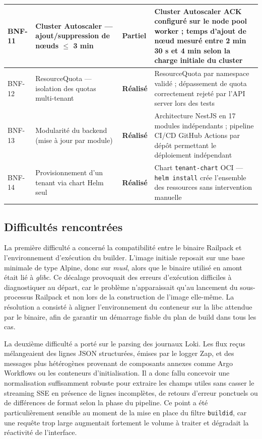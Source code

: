 \begin{longtable}{|p{0.8cm}|p{5.5cm}|p{2.2cm}|p{4.5cm}|}
BNF-11
  & Cluster Autoscaler — ajout/suppression de nœuds $\leq$ 3 min
  & \textcolor{orange!80!black}{\textbf{Partiel}}
  & Cluster Autoscaler ACK configuré sur le node pool worker ; temps d'ajout de nœud mesuré entre 2 min 30 s et 4 min selon la charge initiale du cluster \\
\hline

BNF-12
  & ResourceQuota — isolation des quotas multi-tenant
  & \textcolor{green!60!black}{\textbf{Réalisé}}
  & ResourceQuota par namespace validé ; dépassement de quota correctement rejeté par l'API server lors des tests \\
\hline

BNF-13
  & Modularité du backend (mise à jour par module)
  & \textcolor{green!60!black}{\textbf{Réalisé}}
  & Architecture NestJS en 17 modules indépendants ; pipeline CI/CD GitHub Actions par dépôt permettant le déploiement indépendant \\
\hline

BNF-14
  & Provisionnement d'un tenant via chart Helm seul
  & \textcolor{green!60!black}{\textbf{Réalisé}}
  & Chart \texttt{tenant-chart} OCI — \texttt{helm install} crée l'ensemble des ressources sans intervention manuelle \\
\hline

\end{longtable}

\subsection{Difficultés rencontrées}

La première difficulté a concerné la compatibilité entre le binaire Railpack et l'environnement d'exécution du builder. L'image initiale reposait sur une base minimale de type Alpine, donc sur \textit{musl}, alors que le binaire utilisé en amont était lié à \textit{glibc}. Ce décalage provoquait des erreurs d'exécution difficiles à diagnostiquer au départ, car le problème n'apparaissait qu'au lancement du sous-processus Railpack et non lors de la construction de l'image elle-même. La résolution a consisté à aligner l'environnement du conteneur sur la libc attendue par le binaire, afin de garantir un démarrage fiable du plan de build dans tous les cas.

La deuxième difficulté a porté sur le parsing des journaux Loki. Les flux reçus mélangeaient des lignes JSON structurées, émises par le logger Zap, et des messages plus hétérogènes provenant de composants annexes comme Argo Workflows ou les conteneurs d'initialisation. Il a donc fallu concevoir une normalisation suffisamment robuste pour extraire les champs utiles sans casser le streaming SSE en présence de lignes incomplètes, de retours d'erreur ponctuels ou de différences de format selon la phase du pipeline. Ce point a été particulièrement sensible au moment de la mise en place du filtre \texttt{build\textunderscore id}, car une requête trop large augmentait fortement le volume à traiter et dégradait la réactivité de l'interface.

